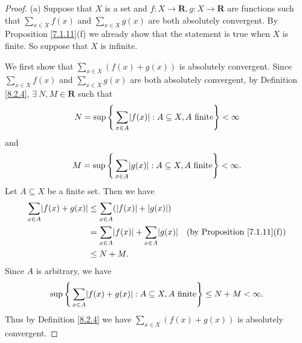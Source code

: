\begin{proof}{(a)}
    Suppose that \(X\) is a set and \(f : X \to \mathbf{R}, g : X \to \mathbf{R}\) are functions such that \(\sum_{x \in X} f(x)\) and \(\sum_{x \in X} g(x)\) are both absolutely convergent.
    By Proposition \ref{7.1.11}(f) we already show that the statement is true when \(X\) is finite.
    So suppose that \(X\) is infinite.

    We first show that \(\sum_{x \in X} (f(x) + g(x))\) is absolutely convergent.
    Since \(\sum_{x \in X} f(x)\) and \(\sum_{x \in X} g(x)\) are both absolutely convergent, by Definition \ref{8.2.4}, \(\exists\ N, M \in \mathbf{R}\) such that
    \[
        N = \sup\Bigg\{\sum_{x \in A} \abs*{f(x)} : A \subseteq X, A \text{ finite}\Bigg\} < \infty
    \]
    and
    \[
        M = \sup\Bigg\{\sum_{x \in A} \abs*{g(x)} : A \subseteq X, A \text{ finite}\Bigg\} < \infty.
    \]
    Let \(A \subseteq X\) be a finite set.
    Then we have
    \begin{align*}
        \sum_{x \in A} \abs*{f(x) + g(x)} & \leq \sum_{x \in A} (\abs*{f(x)} + \abs*{g(x)})                                                     \\
                                          & = \sum_{x \in A} \abs*{f(x)} + \sum_{x \in A} \abs*{g(x)} & \text{(by Proposition \ref{7.1.11}(f))} \\
                                          & \leq N + M.
    \end{align*}
    Since \(A\) is arbitrary, we have
    \[
        \sup\Bigg\{\sum_{x \in A} \abs*{f(x) + g(x)} : A \subseteq X, A \text{ finite}\Bigg\} \leq N + M < \infty.
    \]
    Thus by Definition \ref{8.2.4} we have \(\sum_{x \in X} (f(x) + g(x))\) is absolutely convergent.


\end{proof}

